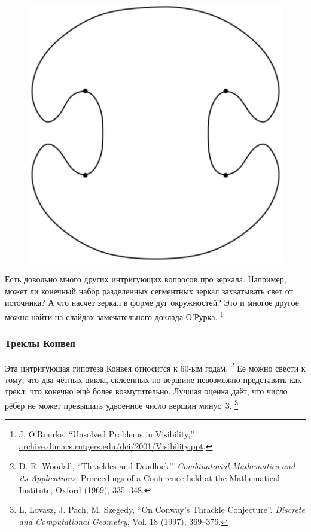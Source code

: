 \begin{figure}[h!]
\centering
\includegraphics[scale=0.5]{Figs/UnsolvedPuzzles/klee}
\end{figure} 

Есть довольно много других интригующих вопросов про зеркала.
Например, может ли конечный набор разделенных сегментных зеркал захватывать свет от источника?
А что насчет зеркал в форме дуг окружностей?
Это и многое другое можно найти на слайдах замечательного доклада О’Рурка.%
\footnote{J. O'Rourke, ``Unsolved Problems in Visibility,''
\href{http://archive.dimacs.rutgers.edu/dci/2001/Visibility.ppt}{\url{archive.dimacs.rutgers.edu/dci/2001/Visibility.ppt}}.}

\subsubsection*{Треклы Конвея}

Эта интригующая гипотеза Конвея относится к 60-ым годам.%
\footnote{D. R. Woodall, ``Thrackles and Deadlock''. \emph{Combinatorial Mathematics and its Applications}, Proceedings of a Conference held at the Mathematical Institute, Oxford (1969), 335--348.}
Её можно свести к тому, что два чётных цикла, склеенных по вершине невозможно представить как трекл;
что конечно ещё более возмутительно.
Лучшая оценка даёт, что число рёбер не может превышать удвоенное число вершин минус~3.%
\footnote{L. Lovasz, J. Pach, M. Szegedy, ``On Conway's Thrackle Conjecture''. \emph{Discrete and Computational Geometry}, Vol. 18 (1997), 369--376.}

